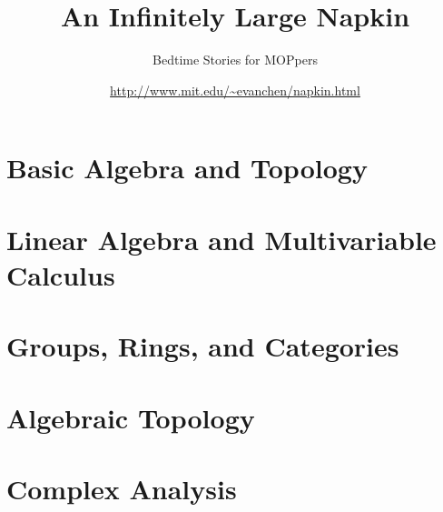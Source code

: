 \documentclass[11pt,numbers=noenddot]{scrreprt}
\begin{document}
\title{An Infinitely Large Napkin}
\subtitle{Bedtime Stories for MOPpers}
\date{\url{http://www.mit.edu/~evanchen/napkin.html}}
\maketitle



\tableofcontents




\part{Basic Algebra and Topology}






\part{Linear Algebra and Multivariable Calculus}


\part{Groups, Rings, and Categories}




\part{Algebraic Topology}


\part{Complex Analysis}



%
\end{document}
